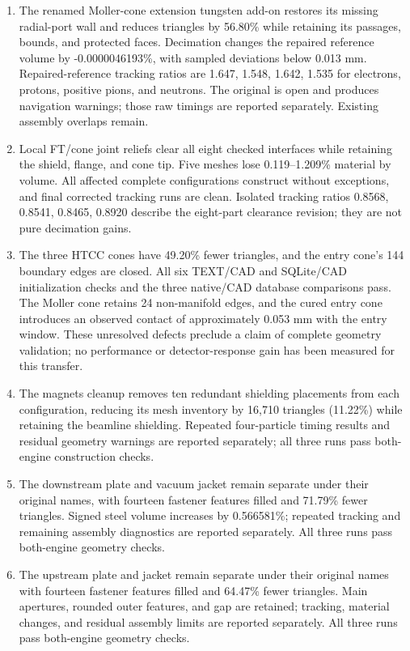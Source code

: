 \begin{enumerate}
\item The renamed Moller-cone extension tungsten add-on restores its missing radial-port wall and reduces
triangles by 56.80\% while retaining its passages, bounds, and protected faces. Decimation changes the
repaired reference volume by -0.0000046193\%, with sampled deviations below 0.013 mm. Repaired-reference
tracking ratios are 1.647, 1.548, 1.642, 1.535 for electrons, protons, positive pions, and neutrons. The
original is open and produces navigation warnings; those raw timings are reported separately. Existing
assembly overlaps remain.

\item Local FT/cone joint reliefs clear all eight checked interfaces while retaining the shield, flange, and
cone tip. Five meshes lose 0.119--1.209\% material by volume. All affected complete configurations construct
without exceptions, and final corrected tracking runs are clean. Isolated tracking ratios 0.8568, 0.8541,
0.8465, 0.8920 describe the eight-part clearance revision; they are not pure decimation gains.

\item The three HTCC cones have 49.20\% fewer triangles, and the entry cone's 144 boundary edges are closed.
All six TEXT/CAD and SQLite/CAD initialization checks and the three native/CAD database comparisons pass. The
Moller cone retains 24 non-manifold edges, and the cured entry cone introduces an observed contact of
approximately 0.053 mm with the entry window. These unresolved defects preclude a claim of complete geometry
validation; no performance or detector-response gain has been measured for this transfer.

\item The magnets cleanup removes ten redundant shielding placements from each configuration,
reducing its mesh inventory by 16,710 triangles (11.22\%) while retaining the beamline shielding. Repeated
four-particle timing results and residual geometry warnings are reported separately; all three runs pass
both-engine construction checks.

\item The downstream plate and vacuum jacket remain separate under their original names, with fourteen fastener
features filled and 71.79\% fewer triangles. Signed steel volume increases by 0.566581\%; repeated tracking
and remaining assembly diagnostics are reported separately. All three runs pass both-engine geometry checks.

\item The upstream plate and jacket remain separate under their original names with fourteen fastener features
filled and 64.47\% fewer triangles. Main apertures, rounded outer features, and gap are retained; tracking,
material changes, and residual assembly limits are reported separately. All three runs pass both-engine
geometry checks.


\end{enumerate}

